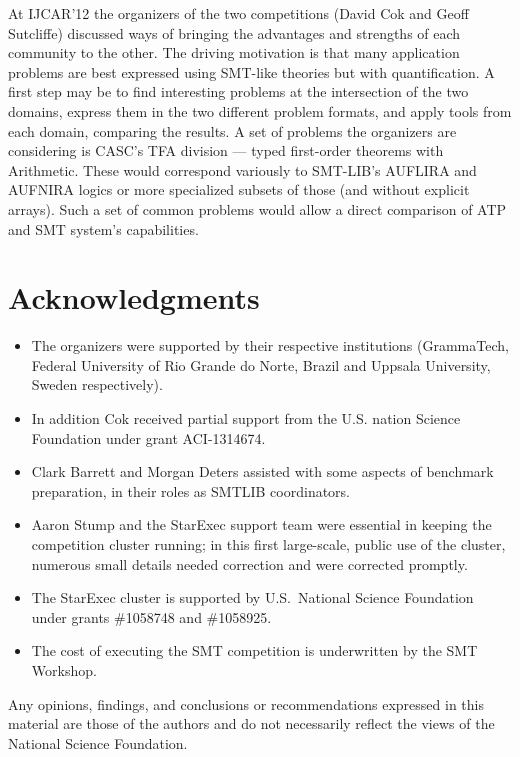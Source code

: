 \documentclass[twosize,11pt]{article}
\begin{document}
At IJCAR'12 the organizers of the two competitions (David Cok and Geoff Sutcliffe) discussed ways of bringing the advantages and strengths of each community to the other. The driving motivation is that many application problems are best expressed using SMT-like theories but with quantification. A first step may be to find interesting problems at the 
intersection of the two domains, express them in the two different problem formats, and apply tools from each domain, comparing the results. A set of problems the organizers are considering is CASC's TFA division --- typed first-order theorems with Arithmetic. These would correspond variously to SMT-LIB's AUFLIRA and AUFNIRA logics or more specialized subsets of those (and without explicit arrays). Such a set of common problems would allow a direct comparison of ATP and SMT system's capabilities.
   


\section*{Acknowledgments} 
\begin{itemize}
\item The organizers were supported by their respective institutions (GrammaTech, Federal University of Rio Grande do Norte, Brazil and Uppsala University, Sweden respectively). 

\item In addition Cok received partial support from the U.S. nation Science Foundation
under grant ACI-1314674.

\item Clark Barrett and Morgan Deters assisted with some aspects of benchmark preparation,
in their roles as SMTLIB coordinators.

\item Aaron Stump and the StarExec support team were essential in keeping the competition cluster running;
in this first large-scale, public use of the cluster, numerous small details needed correction and were corrected promptly.

\item The StarExec cluster is supported by 
U.S.\ National Science Foundation under grants \#1058748 and \#1058925.


\item The cost of executing the SMT competition is underwritten by the SMT Workshop. 
\end{itemize}

Any opinions,
findings, and conclusions or recommendations expressed in this
material are those of the authors and do not necessarily reflect the
views of the National Science Foundation.



\end{document}
